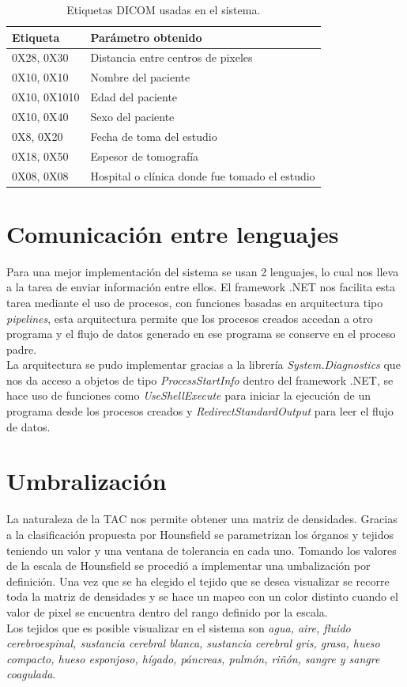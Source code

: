 \documentclass[12pt]{report}
\begin{document}
\begin{table}[H]
\begin{center}
\begin{tabular}{|p{30mm}|p{40mm}|}
\hline
Etiqueta & Parámetro obtenido\\
\hline \hline 
0X28, 0X30 & Distancia entre centros de pixeles\\
\hline
0X10, 0X10 & Nombre del paciente\\
\hline
0X10, 0X1010 & Edad del paciente\\
\hline
0X10, 0X40 & Sexo del paciente\\
\hline
0X8, 0X20 & Fecha de toma del estudio\\
\hline
0X18, 0X50 & Espesor de tomografía\\
\hline
0X08, 0X08 & Hospital o clínica donde fue tomado el estudio\\
\hline
\end{tabular}
\caption{Etiquetas DICOM usadas en el sistema.}
\end{center}
\end{table}

\section{Comunicación entre lenguajes}
Para una mejor implementación del sistema se usan 2 lenguajes, lo cual nos lleva a la tarea de enviar información entre ellos. El framework .NET nos facilita esta tarea mediante el uso de procesos, con funciones basadas en arquitectura tipo \textit{pipelines}, esta arquitectura permite que los procesos creados accedan a otro programa y el flujo de datos generado en ese programa se conserve en el proceso padre.\\

La arquitectura se pudo implementar gracias a la librería \textit{System.Diagnostics} que nos da acceso a objetos de tipo \textit{ProcessStartInfo} dentro del framework .NET, se hace uso de funciones como \textit{UseShellExecute} para iniciar la ejecución de un programa desde los procesos creados y \textit{RedirectStandardOutput} para leer el flujo de datos.

\section{Umbralización}
La naturaleza de la TAC nos permite obtener una matriz de densidades. Gracias a la clasificación propuesta por Hounsfield se parametrizan los órganos y tejidos teniendo un valor y una ventana de tolerancia en cada uno. Tomando los valores de la escala de Hounsfield se procedió a implementar una umbalización por definición. Una vez que se ha elegido el tejido que se desea visualizar se recorre toda la matriz de densidades y se hace un mapeo con un color distinto cuando el valor de pixel se encuentra dentro  del rango definido por la escala.\\
Los tejidos que es posible visualizar en el sistema son \textit{agua, aire, fluido cerebroespinal, sustancia cerebral blanca, sustancia cerebral gris, grasa, hueso compacto, hueso esponjoso, hígado, páncreas, pulmón, riñón, sangre y sangre coagulada}.
\end{document}
